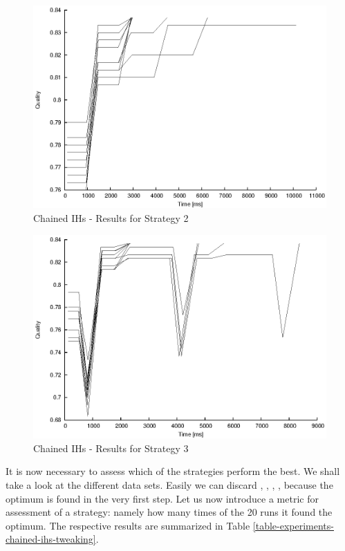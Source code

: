 \begin{figure}
  \caption{Chained IHs -  Results for Strategy 2}
  \label{image-experiment-chained-ihs-s2}
  \centering
    \includegraphics[width=\textwidth]{images/experiments/chained-ihs-s2}
\end{figure}

\begin{figure}
  \caption{Chained IHs -  Results for Strategy 3}
  \label{image-experiment-chained-ihs-s3}
  \centering
    \includegraphics[width=\textwidth]{images/experiments/chained-ihs-s3}
\end{figure}

It is now necessary to assess which of the strategies perform the best. We shall take a look at the different data sets. Easily we can discard , , , , because the optimum is found in the very first step. Let us now introduce a metric for assessment of a strategy: namely how many times of the 20 runs it found the optimum. The respective results are summarized in Table \ref{table-experiments-chained-ihs-tweaking}.

